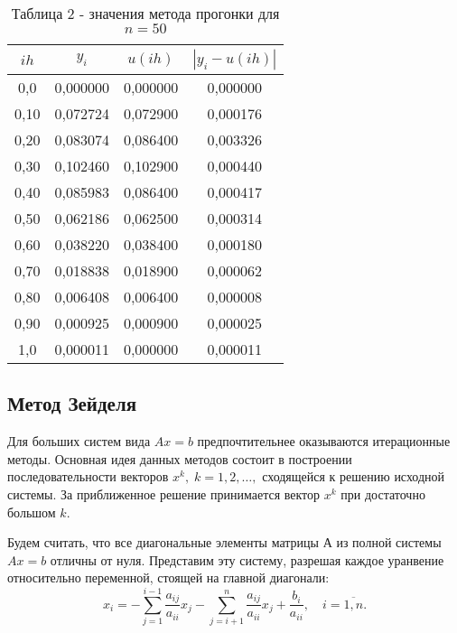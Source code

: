 \documentclass[a4paper,12pt]{article}
\begin{document}
{\begin{table}[h]
\begin{tabular}{|c|c|c|c|}
        \hline
        $ih$ & $y_i$ & $u(ih)$ & $\left|y_i - u(ih)\right|$\\
        \hline
        0,0 & 0,000000  & 0,000000  & 0,000000  \\           
        \hline
        0,10 & 0,072724  & 0,072900  & 0,000176  \\
        \hline
        0,20 & 0,083074  & 0,086400  & 0,003326  \\
        \hline
        0,30 & 0,102460  & 0,102900  & 0,000440  \\
        \hline
        0,40 & 0,085983  & 0,086400  & 0,000417  \\
        \hline
        0,50 & 0,062186  & 0,062500  & 0,000314  \\
        \hline
        0,60 & 0,038220  & 0,038400  & 0,000180  \\
        \hline
        0,70 & 0,018838  & 0,018900  & 0,000062  \\
        \hline
        0,80 & 0,006408  & 0,006400  & 0,000008  \\
        \hline
        0,90 & 0,000925  & 0,000900  & 0,000025  \\
        \hline
        1,0 & 0,000011  & 0,000000  & 0,000011  \\
        \hline
    \end{tabular}
    \caption*{\small{Таблица 2 - значения метода прогонки для $n = 50$}}
\end{table}
\subsection{Метод Зейделя}
\hspace*{1.25cm}Для больших систем вида $Ax=b$ предпочтительнее оказываются итерационные методы. 
Основная идея данных методов состоит в построении последовательности векторов $x^k, \; k=1,2,\dots,$ 
сходящейся к решению исходной системы. За приближенное решение принимается вектор $x^k$ при достаточно большом $k$.

Будем считать, что все диагональные элементы матрицы $А$ из полной системы $Ax=b$ отличны от нуля. 
Представим эту систему, разрешая каждое уранвение относительно переменной, стоящей на главной диагонали: 
\begin{equation}
x_i = - \sum\limits_{j=1}^{i-1} \frac{a_{ij}}{a_{ii}}x_j - \sum\limits_{j=i+1}^n \frac{a_{ij}}{a_{ii}}x_j+\frac{b_i}{a_{ii}}, \quad i = \overline{1,n}.
 \label{5}
\end{equation}

}
\end{document}
